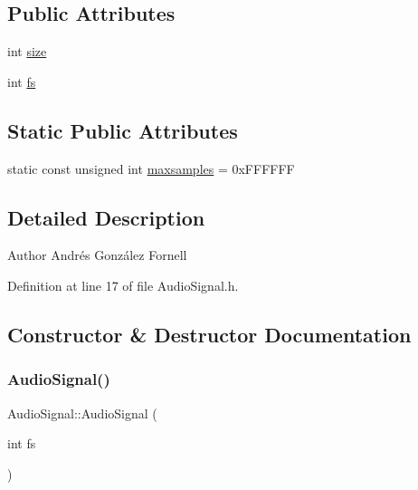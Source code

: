 \subsection*{Public Attributes}
\begin{DoxyCompactItemize}
\item 
int \hyperlink{class_audio_signal_a44e595328705720f380613f1675dbdd1}{size}
\item 
int \hyperlink{class_audio_signal_acc2dc31d0dc3ca222df68a88c00cf2c9}{fs}
\end{DoxyCompactItemize}
\subsection*{Static Public Attributes}
\begin{DoxyCompactItemize}
\item 
static const unsigned int \hyperlink{class_audio_signal_a5d68faf1ab7f19197b93cc2cc0a7e645}{maxsamples} = 0x\+F\+F\+F\+F\+FF
\end{DoxyCompactItemize}


\subsection{Detailed Description}
\begin{DoxyAuthor}{Author}
Andrés González Fornell 
\end{DoxyAuthor}


Definition at line 17 of file Audio\+Signal.\+h.



\subsection{Constructor \& Destructor Documentation}
\mbox{\label{class_audio_signal_a72df7e0c092777d7b829ee7229d5d6f8}} 
\subsubsection{\texorpdfstring{Audio\+Signal()}{AudioSignal()}\hspace{0.1cm}{\footnotesize\ttfamily [1/2]}}
{\footnotesize\ttfamily Audio\+Signal\+::\+Audio\+Signal (\begin{DoxyParamCaption}\item[{int}]{fs }\end{DoxyParamCaption})}


